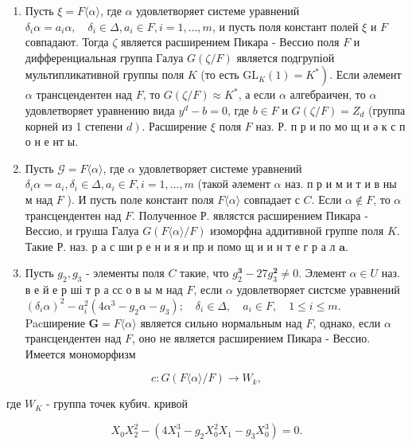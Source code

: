 \documentclass[10pt]{article}
\begin{document}
\begin{enumerate}

  \item Пусть $\xi=F\langle\alpha\rangle$, где $\alpha$ удовлетворяет системе уравнений $\delta_{i} \alpha=a_{i} \alpha, \quad \delta_{i} \in \Delta, a_{i} \in F, i=1, \ldots, m$, и пусть поля констант полей $\xi$ и $F$ совпадают. Тогда $\zeta$ является расширением Пикара - Вессио поля $F$ и дифференциальная группа Галуа $G(\zeta / F)$ является подгрупіой мультипликативной группы поля $K$ (то есть $\left.\mathrm{GL}_{K}(1)=K^{*}\right)$. Если әлемент $\alpha$ трансцендентен над $F$, то $G(\zeta / F) \approx K^{*}$, а если $\alpha$ алгебраичен, то $\alpha$ удовлетворяет уравнению вида $y^{d}-b=0$, где $b \in F$ и $G(\zeta / F)=Z_{d}$ (группа корней из 1 степени $\left.d\right)$. Расширение $\xi$ поля $F$ наз. Р. п р и по мо щ и ә к с п о н е нт ы.



  \item Пусть $\mathcal{G}=F\langle\alpha\rangle$, где $\alpha$ удовлетворяет системе уравнений $\delta_{i} \alpha=a_{i}, \delta_{i} \in \Delta, a_{i} \in F, i=1, \ldots, m$ (такой әлемент $\alpha$ наз. п р и м и т и в ны м над $F$ ). И пусть поле констант поля $F\langle\alpha\rangle$ совпадает с $C$. Если $\alpha \notin F$, то $\alpha$ трансцендентен над $F$. Полученное Р. являстся расширением Пикара - Вессио, и груıша Галуа $G(F\langle\alpha\rangle / F)$ изоморфна аддитивной группе поля $K$. Такие Р. наз. р а с ши р е н и я и пр и помо щ и и н т е г р а л $\mathbf{a}$.



  \item Пусть $g_{2}, g_{3}$ - элементы поля $C$ такие, что $g_{2}^{\mathbf{3}}-27 g_{3}^{\mathbf{2}} \neq 0$. Элемент $\alpha \in U$ наз. в е й е р ші т р а сс о в ы м над $F$, если $\alpha$ удовлетворяет систсме уравнений $\left(\delta_{i} \alpha\right)^{2}-a_{i}^{2}\left(4 \alpha^{3}-g_{2} \alpha-g_{3}\right) ; \quad \delta_{i} \in \Delta, \quad a_{i} \in F, \quad 1 \leqslant i \leqslant m . \quad$ Pacширение $\boldsymbol{G}=F\langle\alpha\rangle$ является сильно нормальным над $F$, однако, если $\alpha$ трансцендентен над $F$, оно не является расширением Пикара - Вессио. Имеется мономорфизм



\end{enumerate}



\[

c: G(F\langle\alpha\rangle / F) \rightarrow W_{k},

\]



где $W_{K}$ - группа точек кубич. кривой



\[

X_{0} X_{2}^{2}-\left(4 X_{1}^{3}-g_{2} X_{0}^{2} X_{1}-g_{3} X_{0}^{3}\right)=0 .

\]
\end{document}
